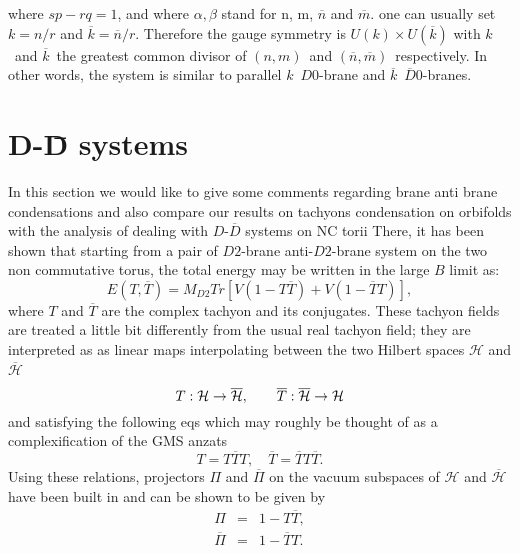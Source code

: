 \documentclass[a4paper,12pt]{article}
\begin{document}
where $sp-rq=1$, and where $\alpha ,\beta $ stand for n, m, $\overline{n}$
 and $\overline{m}$. one can usually set \ $k=n/r$ and $\overline{k}=%
\overline{n}/r$. Therefore the gauge symmetry is $U(k)\times U(\overline{k})$
with $k$\ and $\overline{k}$\ the greatest common divisor of $\left(
n,m\right) $\ and $\left( \overline{n},\overline{m}\right) $\ respectively.
In other words, the system is similar to parallel $k$\ $D0$-brane and $%
\overline{k}$\ $\overline{D}0$-branes.

\section{D-\={D} systems}

In this section we would like to give some comments regarding
brane anti brane condensations and also compare our results on
tachyons condensation on orbifolds with the analysis of \cite{g}
dealing with $D$-$\overline{D}$ systems on NC torii There, it has
been shown that starting from a pair of $D2$-brane anti-$D2$-brane
system on the two non commutative torus, the total energy may be
written in the large $B$ limit as:
\begin{equation}\label{barenergy}
E(T,\overline{T})=M_{D2}Tr[V(1-T\overline{T})+V(1-\overline{T}T)],
\end{equation}
where $T$ and $\overline{T}$ are the complex tachyon and its conjugates.
These tachyon fields are treated a little bit differently from the usual
real tachyon field; they are interpreted as as linear maps interpolating
between the two Hilbert spaces $\mathcal{H}$ and $\overline{\mathcal{H}}$\
\begin{equation*}
T:\mathcal{H}\rightarrow \overline{\mathcal{H}},\qquad \overline{T}:\overline{%
\mathcal{H}}\rightarrow \mathcal{H}
\end{equation*}
and satisfying the following eqs which may roughly be thought of
as a complexification of the GMS anzats
\begin{equation}\label{tbart}
T=T\overline{T}T,\quad \overline{T}=\overline{T}T\overline{T}.
\end{equation}
Using these relations, projectors $\Pi $ and $\overline{\Pi}$ on the vacuum subspaces
of $\mathcal{H}$ and $\overline{\mathcal{H}}$ have been built in \cite{h} and can
be shown to be given by
\begin{eqnarray}\label{pitbart}
\Pi &=&1-T\overline{T}, \\
\overline{\Pi } &=&1-\overline{T}T.
\end{eqnarray}
\end{document}
